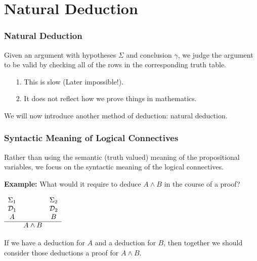 \documentclass{beamer}
\theoremstyle{indentDefn} \newtheorem{defn}[]{Definition}
\begin{document}
\section{Natural Deduction}

\begin{frame}
	\frametitle{Natural Deduction}
	
	Given an argument with hypotheses $\Sigma$ and conclusion $\gamma$, we judge the argument to be valid by checking all of the rows in the corresponding truth table.
	
	\vspace{0.5cm}
		
	\begin{itemize}
		\item[1.] This is slow (Later impossible!).
		\item[2.] It does not reflect how we prove things in mathematics.
	\end{itemize} 

	\vspace{0.5cm}
	
	We will now introduce another method of deduction: natural deduction. 
	
	\vspace{0.5cm}
	
	
\end{frame}

\begin{frame}
	\frametitle{Syntactic Meaning of Logical Connectives}
	
	Rather than using the semantic (truth valued) meaning of the propositional variables, we focus on the syntactic meaning of the logical connectives. 
	
	\vspace{0.5cm}
	
	{\bf Example:} What would it require to deduce $A \land B$ in the course of a proof? 

	\pause
	
	\begin{center}
		$\begin{array}{ c  c  c }			
			\Sigma_{1} & & \Sigma_{2} \\
			\mathcal{D}_{1} & & \mathcal{D}_{2} \\
			A & & B \\
			\cline{1 - 3}
			 & A \land B &  \\ 	
		\end{array}$
	\end{center}

	If we have a deduction for $A$ and a deduction for $B$, then together we should consider those deductions a proof for $A \land B$.	
\end{frame}
\end{document}
